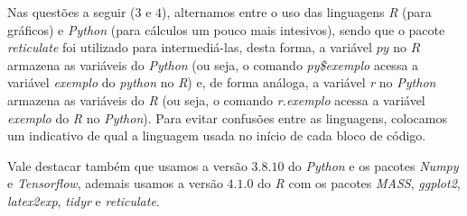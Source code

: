 \documentclass[
]{article}
\newenvironment{Shaded}{\begin{snugshade}}{\end{snugshade}}
\newcommand{\AttributeTok}[1]{\textcolor[rgb]{0.77,0.63,0.00}{#1}}
\newcommand{\CommentTok}[1]{\textcolor[rgb]{0.56,0.35,0.01}{\textit{#1}}}
\newcommand{\ConstantTok}[1]{\textcolor[rgb]{0.00,0.00,0.00}{#1}}
\newcommand{\FunctionTok}[1]{\textcolor[rgb]{0.00,0.00,0.00}{#1}}
\newcommand{\NormalTok}[1]{#1}
\newcommand{\SpecialCharTok}[1]{\textcolor[rgb]{0.00,0.00,0.00}{#1}}
\begin{document}
Nas questões a seguir (\(3\) e \(4\)), alternamos entre o uso das
linguagens \emph{R} (para gráficos) e \emph{Python} (para cálculos um
pouco mais intesivos), sendo que o pacote \emph{reticulate} foi
utilizado para intermediá-las, desta forma, a variável \(py\) no \(R\)
armazena as variáveis do \emph{Python} (ou seja, o comando
\emph{py\$exemplo} acessa a variável \emph{exemplo} do \emph{python} no
\emph{R}) e, de forma análoga, a variável \emph{r} no \emph{Python}
armazena as variáveis do \emph{R} (ou seja, o comando \emph{r.exemplo}
acessa a variável \emph{exemplo} do \emph{R} no \emph{Python}). Para
evitar confusões entre as linguagens, colocamos um indicativo de qual a
linguagem usada no início de cada bloco de código.

Vale destacar também que usamos a versão \(3.8.10\) do \emph{Python} e
os pacotes \emph{Numpy} e \emph{Tensorflow}, ademais usamos a versão
\(4.1.0\) do \emph{R} com os pacotes \emph{MASS}, \emph{ggplot2},
\emph{latex2exp}, \emph{tidyr} e \emph{reticulate}.

\begin{Shaded}
\end{Shaded}
\end{document}
